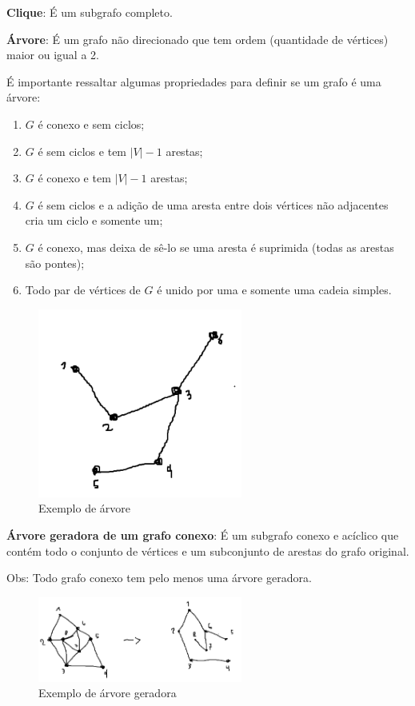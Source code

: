 \medskip

\textbf{Clique}:  
É um subgrafo completo.

\medskip

\textbf{Árvore}:  
É um grafo não direcionado que tem ordem (quantidade de vértices) maior ou igual a 2.  

É importante ressaltar algumas propriedades para definir se um grafo é uma árvore:
\begin{enumerate}
    \item $G$ é conexo e sem ciclos;
    \item $G$ é sem ciclos e tem $|V|-1$ arestas;
    \item $G$ é conexo e tem $|V|-1$ arestas;
    \item $G$ é sem ciclos e a adição de uma aresta entre dois vértices não adjacentes cria um ciclo e somente um;
    \item $G$ é conexo, mas deixa de sê-lo se uma aresta é suprimida (todas as arestas são pontes);
    \item Todo par de vértices de $G$ é unido por uma e somente uma cadeia simples.
\end{enumerate}

\begin{figure}[H]
    \centering
    \includegraphics[width=0.6\textwidth]{figuras/Arvore.png}
    \caption{Exemplo de árvore}
\end{figure}

\medskip

\textbf{Árvore geradora de um grafo conexo}:  
É um subgrafo conexo e acíclico que contém todo o conjunto de vértices e um subconjunto de arestas do grafo original.  

Obs: Todo grafo conexo tem pelo menos uma árvore geradora.

\begin{figure}[H]
    \centering
    \includegraphics[width=0.6\textwidth]{figuras/Arvoregeradora.png}
    \caption{Exemplo de árvore geradora}
\end{figure}

